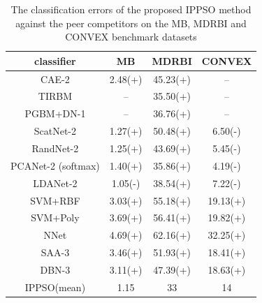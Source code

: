 \documentclass[conference]{IEEEtran}
\begin{document}
\begin{table}[!t]
	\renewcommand{\arraystretch}{1.3}
	\caption{The classification errors of the proposed IPPSO method against the peer competitors on the MB, MDRBI and CONVEX benchmark datasets}
	\label{table:ResultComparison}
	\centering
	\begin{tabular}{|c|c|c|c|}
		\hline
		classiﬁer & MB & MDRBI & CONVEX\\
		\hline
		CAE-2 & 2.48(+) & 45.23(+) & --\\
		\hline
		TIRBM & -- & 35.50(+) & --\\
		\hline
		PGBM+DN-1 & -- & 36.76(+) & --\\
		\hline
		ScatNet-2 & 1.27(+) & 50.48(+) & 6.50(-)\\
		\hline
		RandNet-2 & 1.25(+) & 43.69(+) & 5.45(-)\\
		\hline
		PCANet-2 (softmax)  & 1.40(+) & 35.86(+) & 4.19(-)\\
		\hline
		LDANet-2 & 1.05(-) & 38.54(+) & 7.22(-)\\
		\hline
		SVM+RBF & 3.03(+) & 55.18(+) & 19.13(+)\\
		\hline
		SVM+Poly & 3.69(+) & 56.41(+) & 19.82(+)\\
		\hline
		NNet & 4.69(+) & 62.16(+) & 32.25(+)\\
		\hline
		SAA-3 & 3.46(+) & 51.93(+) & 18.41(+)\\
		\hline
		DBN-3  & 3.11(+) & 47.39(+) & 18.63(+)\\
		\hline
		IPPSO(mean) & 1.15 & 33 & 14\\
		\hline
	\end{tabular}
\end{table}
\end{document}
